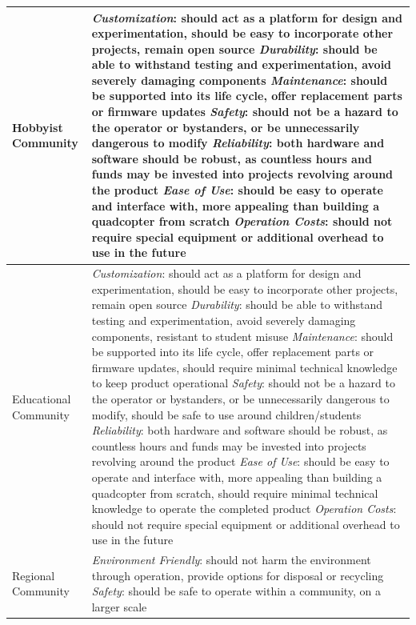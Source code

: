 \documentclass[a4paper,10pt]{scrartcl}
\begin{document}
\newpage
\begin{center}
\begin{tabular}{| l | p{7.5cm} |}
\hline
Hobbyist Community & \emph{Customization}: should act as a platform for design
and experimentation, should be easy to incorporate other projects, remain
open source\newline
\emph{Durability}: should be able to withstand testing and experimentation,
avoid severely damaging components\newline
\emph{Maintenance}: should be supported into its life cycle, offer replacement
parts or firmware updates\newline
\emph{Safety}: should not be a hazard to the operator or bystanders, or be
unnecessarily dangerous to modify\newline
\emph{Reliability}: both hardware and software should be robust, as countless
hours and funds may be invested into projects revolving around the
product\newline
\emph{Ease of Use}: should be easy to operate and interface with, more appealing
than building a quadcopter from scratch\newline
\emph{Operation Costs}: should not require special equipment or additional
overhead to use in the future\\
\hline
Educational Community & \emph{Customization}: should act as a platform for
design and experimentation, should be easy to incorporate other projects, remain
open source\newline
\emph{Durability}: should be able to withstand testing and experimentation,
avoid severely damaging components, resistant to student misuse
\emph{Maintenance}: should be supported into its life cycle, offer replacement
parts or firmware updates, should require minimal technical knowledge to keep
product operational\newline
\emph{Safety}: should not be a hazard to the operator or bystanders, or be
unnecessarily dangerous to modify, should be safe to use around
children/students\newline
\emph{Reliability}: both hardware and software should be robust, as countless
hours and funds may be invested into projects revolving around the
product\newline
\emph{Ease of Use}: should be easy to operate and interface with, more appealing
than building a quadcopter from scratch, should require minimal technical
knowledge to operate the completed product\newline
\emph{Operation Costs}: should not require special equipment or additional
overhead to use in the future\\
\hline
Regional Community & \emph{Environment Friendly}: should not harm the
environment through operation, provide options for disposal or recycling\newline
\emph{Safety}: should be safe to operate within a community, on a larger scale\\
\hline
\end{tabular}
\end{center}
\end{document}
